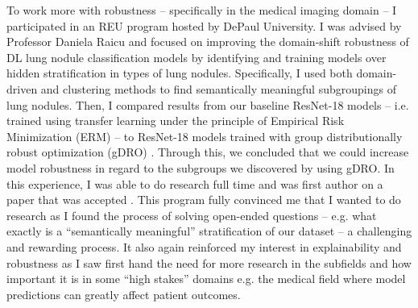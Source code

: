 \documentclass[10pt]{article}
\begin{document}
To work more with robustness -- specifically in the medical imaging domain -- I participated in an REU program hosted by DePaul University. I was advised by Professor Daniela Raicu and focused on improving the domain-shift robustness of DL lung nodule classification models by identifying and training models over hidden stratification in types of lung nodules.
Specifically, I used both domain-driven and clustering methods to find semantically meaningful subgroupings of lung nodules. Then, I compared results from our baseline ResNet-18 models -- i.e. trained using transfer learning under the principle of Empirical Risk Minimization (ERM) -- to ResNet-18 models trained with group distributionally robust optimization (gDRO) \cite{Sagawa*2020Distributionally}. Through this, we concluded that we could increase model robustness in regard to the subgroups we discovered by using gDRO.
In this experience, I was able to do research full time and was first author on a paper that was accepted \cite{zengNo2023}. This program fully convinced me that I wanted to do research
as I found the process of solving open-ended questions -- e.g. what exactly is a ``semantically meaningful'' stratification of our dataset -- a challenging and rewarding process.
It also again reinforced my interest in explainability and robustness as I saw first hand the need for more research in the subfields and how important it is in some ``high stakes'' domains e.g. the medical field where model predictions can greatly affect patient outcomes.
 
\end{document}
